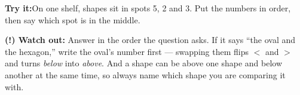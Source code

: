 \documentclass[12pt]{article}
\begin{document}
\begin{tryitbox}
\textbf{Try it:}\quad On one shelf, shapes sit in spots 5, 2 and 3. Put the
numbers in order, then say which spot is in the middle.\\[2pt]
\end{tryitbox}

\begin{watchoutbox}
\textbf{(!) Watch out:} Answer in the order the question asks. If it says
``the oval and the hexagon,'' write the oval's number first --- swapping them
flips $<$ and $>$ and turns \emph{below} into \emph{above}. And a shape can be
above one shape and below another at the same time, so always name which shape
you are comparing it with.
\end{watchoutbox}
\end{document}
